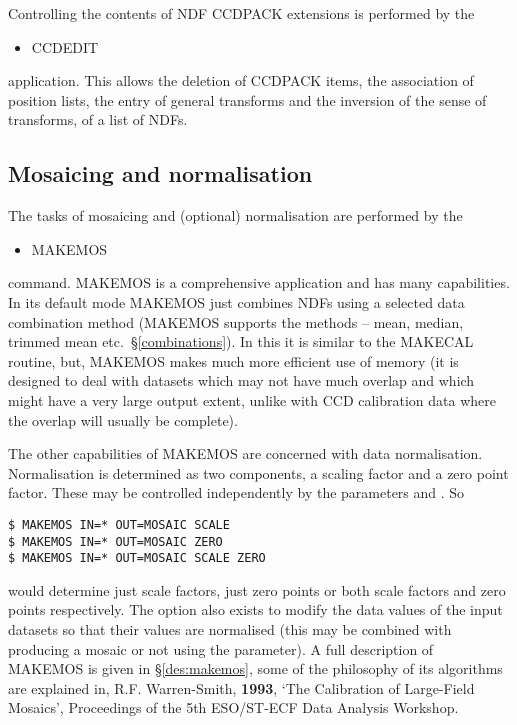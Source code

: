 Controlling the contents of NDF CCDPACK extensions is performed by the
\begin{itemize}
\item CCDEDIT
\end{itemize}
application. This allows the deletion of CCDPACK items, the association
of position lists, the entry of general transforms and the inversion of
the sense of transforms, of a list of NDFs.

\subsection{Mosaicing and normalisation}

The tasks of mosaicing and (optional) normalisation are performed by 
the 
\begin{itemize}
\item MAKEMOS
\end{itemize}
command. MAKEMOS is a comprehensive application and has many
capabilities. In its default mode MAKEMOS just combines NDFs using a
selected data combination method (MAKEMOS supports the methods -- mean,
median, trimmed mean etc.\ \S\ref{combinations}). In this it is similar
to the MAKECAL routine, but, MAKEMOS makes much more efficient use of
memory (it is designed to deal with datasets which may not have much
overlap and which might have a very large output extent, unlike with CCD
calibration data where the overlap will usually be complete).

The other capabilities of MAKEMOS are concerned with data normalisation.
Normalisation is determined as two components, a scaling factor and a
zero point factor. These may be controlled independently by the
parameters  and . So 
\begin{myquote}
\begin{verbatim}
$ MAKEMOS IN=* OUT=MOSAIC SCALE
$ MAKEMOS IN=* OUT=MOSAIC ZERO
$ MAKEMOS IN=* OUT=MOSAIC SCALE ZERO
\end{verbatim}
\end{myquote}
would determine just scale factors, just zero points or both scale
factors and zero points respectively. The option also exists to modify
the data values of the input datasets so that their values are
normalised (this may be combined with producing a mosaic or not using
the  parameter). A full description of MAKEMOS is given in
\S\ref{des:makemos}, some of the philosophy of its algorithms are
explained in, R.F. Warren-Smith, {\bf 1993}, `The Calibration of
Large-Field Mosaics', Proceedings of the 5th ESO/ST-ECF Data Analysis
Workshop.


